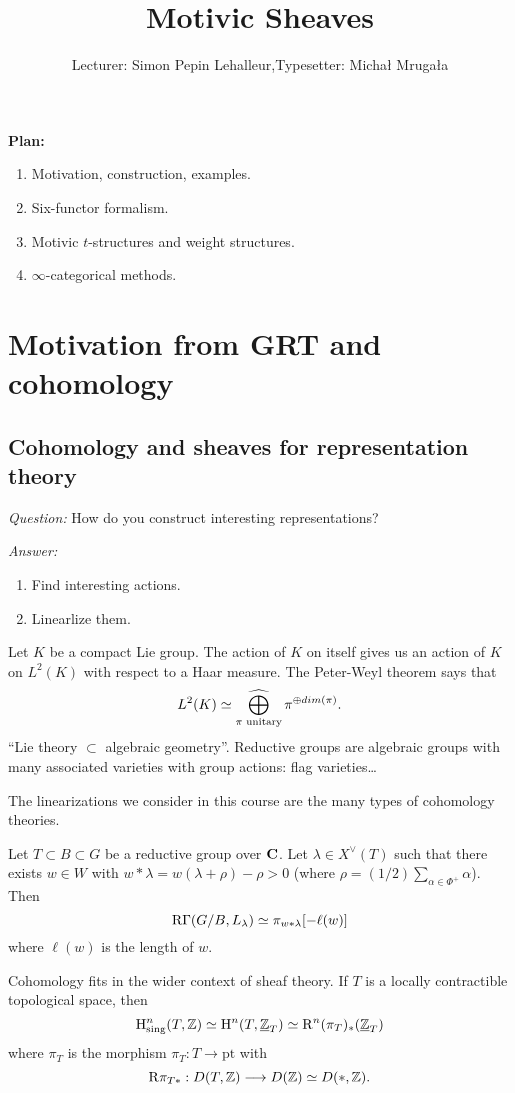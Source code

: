 

\def\DAet{\cat{DA}^{\text{\'et}}}
\def\SH{\cat{SH}}
\def\Sh{\cat{Sh}}
\def\PSh{\cat{PSh}}
\def\Cone{\operatorname{Cone}}
\def\Ch{\cat{Ch}}
\def\ft{^{\text{(f.t)}}}

\title{Motivic Sheaves}
\author{Lecturer: Simon Pepin Lehalleur,\quad Typesetter: Micha{\l} Mruga{\l}a}


\maketitle
\textbf{Plan:}
\begin{enumerate}[L1:]
	\item Motivation, construction, examples.
	\item Six-functor formalism.
	\item Motivic $t$-structures and weight structures.
	\item $\infty$-categorical methods.
\end{enumerate}
\section{Motivation from GRT and cohomology}
\subsection{Cohomology and sheaves for representation theory} \leavevmode

\emph{Question:} How do you construct interesting representations?

\emph{Answer:}
\begin{enumerate}[1)]
	\item Find interesting actions.
	\item Linearlize them.
\end{enumerate}

\begin{example}
	Let $K$ be a compact Lie group. The action of $K$ on itself gives us an action of $K$ on $L^2(K)$ with respect to a Haar measure. The Peter-Weyl theorem says that
	\[
	L^2(K) \isoto \cbigoplus_{\pi\text{ unitary}}\pi^{\oplus dim(\pi)}.
	\]
	``Lie theory $\subset $ algebraic geometry''. Reductive groups are algebraic groups with many associated varieties with group actions: flag varieties\dots
\end{example}
The linearizations we consider in this course are the many types of cohomology theories.

\begin{example}
	Let $T\subset B\subset G$ be a reductive group over $\mathbf{C}$. Let $\lambda\in X^{\vee}(T)$ such that there exists $w\in W$ with $w*\lambda = w(\lambda+\rho)-\rho>0$ (where $\rho = (1 /2)\sum_{\alpha\in \Phi^{+}}\alpha$). Then
	\[
		\mathrm{R}\Gamma(G /B,L_\lambda) \simeq \pi_{w*\lambda}[-\ell(w)]
	\] 
	where $\ell(w)$ is the length of $w$.
\end{example}
Cohomology fits in the wider context of sheaf theory. If $T$ is a locally contractible topological space, then
\[
	\mathrm{H}^{n}_{\text{sing}}(T,\mathbb Z) \simeq \mathrm{H}^{n}(T,\underline{\mathbb{Z}}_T) \simeq \mathrm{R}^{n}(\pi_T)_*(\underline{\mathbb{Z}}_T)	
\]
where $\pi_T$ is the morphism $\pi_T:T\to \text{pt}$ with
\[
\RD\pi_{T*}:D(T,\Z) \to D(\Z) \isoto D(*,\Z)
.\] 

